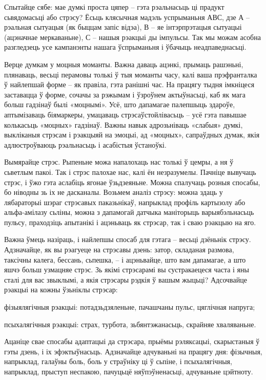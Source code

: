 Спытайце сябе: мае думкі проста цяпер – гэта рэальнасьць ці прадукт сьвядомасьці або стрэсу? Ёсьць клясычная мадэль успрыманьня АВС, дзе А – рэальная сытуацыя (як быццам запіс відэа), В – яе інтэрпрэтацыя сытуацыі (ацэначнае меркаваньне), С – нашыя рэакцыі ды імпульсы. Так мы можам асобна разгледзець усе кампанэнты нашага ўспрыманьня і ўбачыць неадпаведнасьці. 

Верце думкам у моцныя моманты. Важна даваць ацэнкі, прымаць рашэньні, плянаваць, весьці перамовы толькі ў тыя моманты часу, калі ваша прэфранталка ў найлепшай форме – як правіла, гэта ранішні час. На працягу тыдня імкніцеся заставацца ў форме, сочачы за рэжымам і ўзроўнем актыўнасьці, каб як мага больш гадзінаў былі «моцнымі». Усё, што дапамагае палепшыць здароўе, аптымізаваць біямаркеры, умацаваць стрэсаўстойлівасьць – усё гэта павышае колькасьць «моцных» гадзінаў. Важны навык адрозьніваць «слабыя» думкі, выкліканыя стрэсам і рэакцыяй на эмоцыі, ад «моцных», сапраўдных думак, якія адлюстроўваюць рэальнасьць і асабістыя ўстаноўкі.

Вымярайце стрэс. Рыпеньне можа напалохаць нас толькі ў цемры, а ня ў сьветлым пакоі. Так і стрэс палохае нас, калі ён незразумелы. Пачніце вывучаць стрэс, і ўжо гэта аслабіць ягонае ўзьдзеяньне. Можна спалучаць розныя спосабы, бо ніводны зь іх не дасканалы. Возьмем аналіз стрэсу: можна здаць у лябараторыі шэраг стрэсавых паказьнікаў, напрыклад профіль картызолу або альфа-амілазу сьліны, можна з дапамогай датчыка маніторыць варыябэльнасьць пульсу, праходзіць апытанікі і ацэньваць як стрэсар, так і сваю рэакцыю на яго.

Важна ўмець назіраць, і найлепшы спосаб для гэтага – весьці дзёньнік стрэсу. Адзначайце, як вы рэагуеце на стрэсавы дзень: затор, складаная размова, таксічны калега, бессань, сьпешка, – і ацэньвайце, што вам дапамагае, а што яшчэ больш узмацняе стрэс. Зь якімі стрэсарамі вы сустракаецеся часта і яны сталі для вас звыклымі, а якія стрэсары рэдкія ў вашым жыцьці? Адсочвайце рэакцыі на кожны ўзьніклы стрэсар: 

фізыялягічныя рэакцыі: потадзьдзяленьне, пачашчаны пульс, цяглічная напруга;

псыхалягічныя рэакцыі: страх, турбота, зьбянтэжанасьць, скрайняе хваляваньне. 

Ацаніце свае спосабы адаптацыі да стрэсара, прыёмы рэляксацыі, скарыстаныя ў гэты дзень, і іх эфэктыўнасьць. Адзначайце адчуваньні на працягу дня: фізычныя, напрыклад, галаўны боль, боль у страўніку ці ў сьпіне, і псыхалягічныя, напрыклад, прыступ неспакою, пачуцьцё няўпэўненасьці, адчуваньне цэйтноту.

